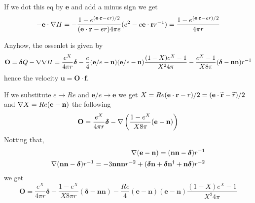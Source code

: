 If we dot this eq by $\textbf{e}$ and add a minus sign we get
\begin{equation}
     - \textbf{e}\cdot \mathbf{\nabla} H
    = -\frac{1 - e^{(\textbf{e}\cdot \textbf{r} -e r)/2}}{(\textbf{e}\cdot \textbf{r} -e r) 4 \pi e} (e^2 - e \textbf{e}\cdot \textbf{r}r^{-1})
    = \frac{1 - e^{(\textbf{e}\cdot \textbf{r} -e r)/2}}{4 \pi r}
\end{equation}


Anyhow, the ossenlet is given by
\begin{equation}
    \textbf{O} = \bm\delta Q - \mathbf{\nabla}\mathbf{\nabla} H
    =
    \frac{e^X}{4\pi r}\bm\delta
    -
    \frac{e}{4}(\textbf{e}/e - \textbf{n})
    (\textbf{e}/e - \textbf{n})
    \frac{(1-X) e^X - 1}{X^2 4 \pi}
    - \frac{e^X- 1}{X 8 \pi }  (\bm\delta  - \textbf{nn} )r^{-1}
\end{equation}
hence the velocity $\textbf{u}=\textbf{O}\cdot \textbf{f}$.


If we substitute $e \to Re$ and $\textbf{e}/e \to \textbf{e}$ we get $X = Re(\textbf{e}\cdot \textbf{r} - r)/2 = (\textbf{e}\cdot \widetilde{\textbf{r} }- \widetilde{r})/2  $ and $\mathbf{\nabla} X = Re (\textbf{e} - \textbf{n})$ the following
\begin{align}
    \textbf{O}
    &=
    \frac{e^X}{4\pi r}\bm\delta
    -\mathbf{\nabla} \left(\frac{1-e^X}{X8\pi}(\textbf{e}- \textbf{n})\right)\\
\end{align}
Notting that,
\begin{align}
    \mathbf{\nabla} (\textbf{e}- \textbf{n}) = (\textbf{nn} - \bm\delta ) r^{-1}\\
    \mathbf{\nabla} (\textbf{nn} - \bm\delta ) r^{-1} = - 3 \textbf{nnn} r^{-2} + (\bm\delta \textbf{n}+ \bm\delta \textbf{n}^\dagger + \textbf{n}\bm\delta) r^{-2}
\end{align}
we get
\begin{equation}
    \textbf{O} =
    \frac{e^X}{4\pi r}\bm\delta
    + \frac{1 - e^X}{X 8 \pi r}  (\bm\delta  - \textbf{nn} )
    -
    \frac{Re}{4}(\textbf{e} - \textbf{n})
    (\textbf{e} - \textbf{n})
    \frac{(1-X) e^X - 1}{X^2 4 \pi}
\end{equation}

